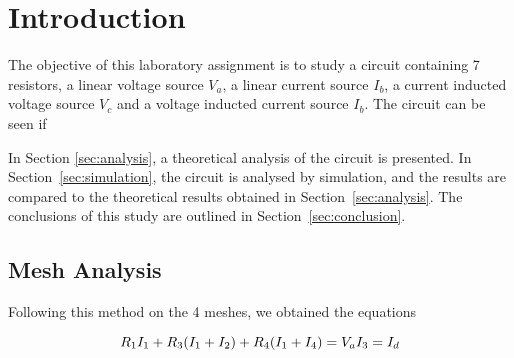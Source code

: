 \section{Introduction}
\label{sec:introduction}

The objective of this laboratory assignment is to study a circuit containing 7 resistors, a linear voltage source $V_a$, a linear current source $I_b$, a current inducted voltage source $V_c$ and a voltage inducted current source $I_b$. The circuit can be seen if %


In Section \ref{sec:analysis}, a theoretical analysis of the circuit is
presented. In Section~\ref{sec:simulation}, the circuit is analysed by
simulation, and the results are compared to the theoretical results obtained in
Section~\ref{sec:analysis}. The conclusions of this study are outlined in
Section~\ref{sec:conclusion}.

\subsection{Mesh Analysis}
Following this method on the 4 meshes, we obtained the equations

\begin{equation}
  R_1 I_1 + R_3 (I_1+I_2)+R_4(I_1+I_4)=V_a \\
 I_3=I_d
\end{equation}





